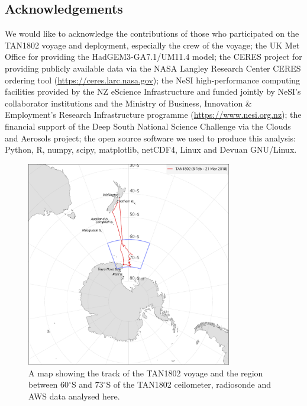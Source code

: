 \subsection*{Acknowledgements}

We would like to acknowledge the contributions of those who participated on
the TAN1802 voyage and deployment, especially the crew of the voyage; the UK Met
Office for providing the HadGEM3-GA7.1/UM11.4 model;
the CERES project for providing publicly available data via the NASA Langley
Research Center CERES ordering tool (\url{https://ceres.larc.nasa.gov});
the
NeSI high-performance computing facilities
provided by the NZ eScience Infrastructure and funded jointly by NeSI's
collaborator institutions and the Ministry of Business, Innovation \&
Employment's Research Infrastructure programme (\url{https://www.nesi.org.nz});
the financial support of the Deep South National Science Challenge via the Clouds and
Aerosols project; the open source software we used to produce this analysis: Python, R,
numpy, scipy, matplotlib,
netCDF4, Linux and Devuan GNU/Linux.

\normalsize

\clearpage

\begin{figure}[t]
\centering
\includegraphics[width=0.8\textwidth]{chapter4/fig/map.pdf}
\caption[A map showing the track of the TAN1802 voyage]{A map showing the track of the TAN1802 voyage and the region
between 60$^\circ$S and 73$^\circ$S of the TAN1802 ceilometer, radiosonde
and AWS data analysed here.
}
\label{fig:map}
\end{figure}

